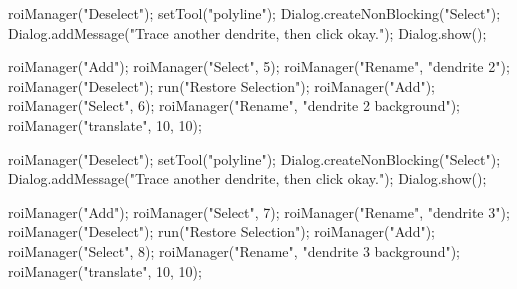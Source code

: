 \documentclass[
  12pt,
  a4paper,
]{book}
\newenvironment{Shaded}{}{}
\newcommand{\DecValTok}[1]{\textcolor[rgb]{0.25,0.63,0.44}{#1}}
\newcommand{\NormalTok}[1]{#1}
\newcommand{\OperatorTok}[1]{\textcolor[rgb]{0.40,0.40,0.40}{#1}}
\newcommand{\StringTok}[1]{\textcolor[rgb]{0.25,0.44,0.63}{#1}}
\begin{document}
\begin{Shaded}
\begin{Highlighting}[]
\NormalTok{    roiManager}\OperatorTok{(}\StringTok{"Deselect"}\OperatorTok{);}
\NormalTok{    setTool}\OperatorTok{(}\StringTok{"polyline"}\OperatorTok{);}
\NormalTok{    Dialog}\OperatorTok{.}\NormalTok{createNonBlocking}\OperatorTok{(}\StringTok{"Select"}\OperatorTok{);}
\NormalTok{    Dialog}\OperatorTok{.}\NormalTok{addMessage}\OperatorTok{(}\StringTok{"Trace another dendrite, then click \textquotesingle{}okay\textquotesingle{}."}\OperatorTok{);}
\NormalTok{    Dialog}\OperatorTok{.}\NormalTok{show}\OperatorTok{();}

\NormalTok{    roiManager}\OperatorTok{(}\StringTok{"Add"}\OperatorTok{);}
\NormalTok{    roiManager}\OperatorTok{(}\StringTok{"Select"}\OperatorTok{,} \DecValTok{5}\OperatorTok{);}
\NormalTok{    roiManager}\OperatorTok{(}\StringTok{"Rename"}\OperatorTok{,} \StringTok{"dendrite 2"}\OperatorTok{);}
\NormalTok{    roiManager}\OperatorTok{(}\StringTok{"Deselect"}\OperatorTok{);}
\NormalTok{    run}\OperatorTok{(}\StringTok{"Restore Selection"}\OperatorTok{);}
\NormalTok{    roiManager}\OperatorTok{(}\StringTok{"Add"}\OperatorTok{);}
\NormalTok{    roiManager}\OperatorTok{(}\StringTok{"Select"}\OperatorTok{,} \DecValTok{6}\OperatorTok{);}
\NormalTok{    roiManager}\OperatorTok{(}\StringTok{"Rename"}\OperatorTok{,} \StringTok{"dendrite 2 background"}\OperatorTok{);}
\NormalTok{    roiManager}\OperatorTok{(}\StringTok{"translate"}\OperatorTok{,} \DecValTok{10}\OperatorTok{,} \DecValTok{10}\OperatorTok{);}
    
\NormalTok{    roiManager}\OperatorTok{(}\StringTok{"Deselect"}\OperatorTok{);}
\NormalTok{    setTool}\OperatorTok{(}\StringTok{"polyline"}\OperatorTok{);}
\NormalTok{    Dialog}\OperatorTok{.}\NormalTok{createNonBlocking}\OperatorTok{(}\StringTok{"Select"}\OperatorTok{);}
\NormalTok{    Dialog}\OperatorTok{.}\NormalTok{addMessage}\OperatorTok{(}\StringTok{"Trace another dendrite, then click \textquotesingle{}okay\textquotesingle{}."}\OperatorTok{);}
\NormalTok{    Dialog}\OperatorTok{.}\NormalTok{show}\OperatorTok{();}

\NormalTok{    roiManager}\OperatorTok{(}\StringTok{"Add"}\OperatorTok{);}
\NormalTok{    roiManager}\OperatorTok{(}\StringTok{"Select"}\OperatorTok{,} \DecValTok{7}\OperatorTok{);}
\NormalTok{    roiManager}\OperatorTok{(}\StringTok{"Rename"}\OperatorTok{,} \StringTok{"dendrite 3"}\OperatorTok{);}
\NormalTok{    roiManager}\OperatorTok{(}\StringTok{"Deselect"}\OperatorTok{);}
\NormalTok{    run}\OperatorTok{(}\StringTok{"Restore Selection"}\OperatorTok{);}
\NormalTok{    roiManager}\OperatorTok{(}\StringTok{"Add"}\OperatorTok{);}
\NormalTok{    roiManager}\OperatorTok{(}\StringTok{"Select"}\OperatorTok{,} \DecValTok{8}\OperatorTok{);}
\NormalTok{    roiManager}\OperatorTok{(}\StringTok{"Rename"}\OperatorTok{,} \StringTok{"dendrite 3 background"}\OperatorTok{);}
\NormalTok{    roiManager}\OperatorTok{(}\StringTok{"translate"}\OperatorTok{,} \DecValTok{10}\OperatorTok{,} \DecValTok{10}\OperatorTok{);}
    

\end{Highlighting}
\end{Shaded}
\end{document}
